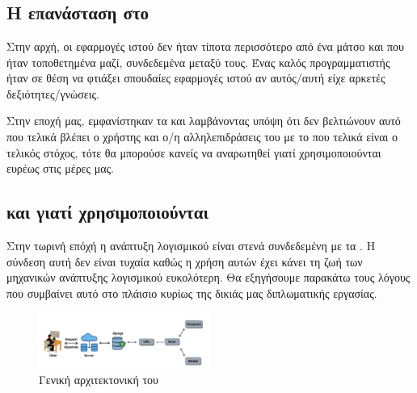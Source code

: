 \chapter{}

\section{Η επανάσταση στο }
Στην αρχή, οι εφαρμογές ιστού δεν ήταν τίποτα περισσότερο από ένα μάτσο  και
 που ήταν τοποθετημένα μαζί, συνδεδεμένα μεταξύ τους. Ένας καλός προγραμματιστής ήταν σε θέση να φτιάξει σπουδαίες εφαρμογές ιστού αν αυτός/αυτή
είχε αρκετές δεξιότητες/γνώσεις.

Στην εποχή μας, εμφανίστηκαν τα  και λαμβάνοντας υπόψη ότι δεν βελτιώνουν αυτό που τελικά βλέπει ο χρήστης και ο/η
αλληλεπιδράσεις του με το  που τελικά είναι ο τελικός στόχος, τότε
θα μπορούσε κανείς να αναρωτηθεί γιατί χρησιμοποιούνται ευρέως στις μέρες μας.


\section{ και γιατί χρησιμοποιούνται}

Στην τωρινή επόχή η ανάπτυξη λογισμικού είναι στενά συνδεδεμένη με τα . Η σύνδεση αυτή δεν είναι τυχαία καθώς η χρήση αυτών έχει κάνει τη ζωή
των μηχανικών ανάπτυξης λογισμικού ευκολότερη. Θα εξηγήσουμε παρακάτω τους λόγους που συμβαίνει αυτό στο πλάισιο κυρίως της δικιάς μας διπλωματικής εργασίας.



\begin{figure}[htb]
	\centering
	\includegraphics[width=0.5\textwidth]{graphics/django_architecture.png}
	\caption{Γενική αρχιτεκτονική του }
\end{figure}

